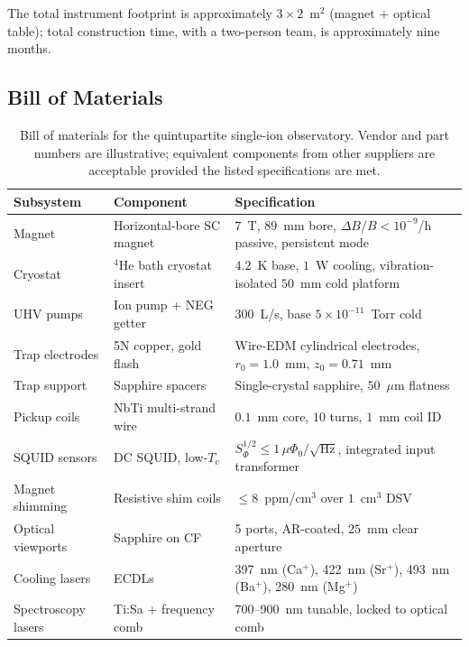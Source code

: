 The total instrument footprint is approximately $3\times2$~m$^2$ (magnet + optical table); total construction time, with a two-person team, is approximately nine months.

\subsection{Bill of Materials}
\label{subsec:bom}

\begin{table}[!htbp]
\centering
\small
\caption{Bill of materials for the quintupartite single-ion observatory. Vendor and part numbers are illustrative; equivalent components from other suppliers are acceptable provided the listed specifications are met.}
\label{tab:bom}
\begin{tabular}{p{}p{}p{}}
\toprule
\textbf{Subsystem} & \textbf{Component} & \textbf{Specification} \\
\midrule
Magnet & Horizontal-bore SC magnet & $7$~T, $89$~mm bore, $\Delta B/B < 10^{-9}$/h passive, persistent mode \\
\addlinespace
Cryostat & $^4$He bath cryostat insert & $4.2$~K base, $1$~W cooling, vibration-isolated $50$~mm cold platform \\
\addlinespace
UHV pumps & Ion pump + NEG getter & $300$~L/s, base $5\times10^{-11}$~Torr cold \\
\addlinespace
Trap electrodes & 5N copper, gold flash & Wire-EDM cylindrical electrodes, $r_0 = 1.0$~mm, $z_0 = 0.71$~mm \\
\addlinespace
Trap support & Sapphire spacers & Single-crystal sapphire, $50$~$\mu$m flatness \\
\addlinespace
Pickup coils & NbTi multi-strand wire & $0.1$~mm core, $10$ turns, $1$~mm coil ID \\
\addlinespace
SQUID sensors & DC SQUID, low-$T_c$ & $S_\Phi^{1/2} \le 1\,\mu\Phi_0/\sqrt{\text{Hz}}$, integrated input transformer \\
\addlinespace
Magnet shimming & Resistive shim coils & $\le 8$~ppm/cm$^3$ over $1$~cm$^3$ DSV \\
\addlinespace
Optical viewports & Sapphire on CF & 5 ports, AR-coated, $25$~mm clear aperture \\
\addlinespace
Cooling lasers & ECDLs & 397~nm (Ca$^+$), 422~nm (Sr$^+$), 493~nm (Ba$^+$), 280~nm (Mg$^+$) \\
\addlinespace
Spectroscopy lasers & Ti:Sa + frequency comb & 700--900~nm tunable, locked to optical comb \\

\end{tabular}
\end{table}
